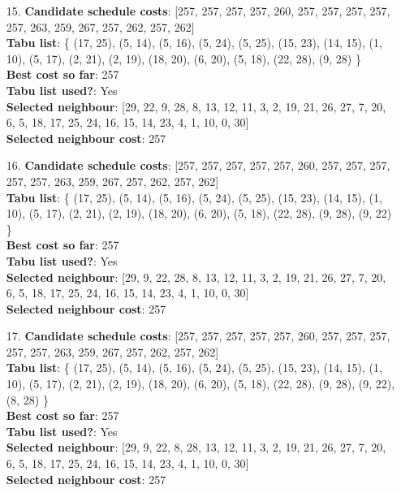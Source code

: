 \documentclass[fleqn]{article}
\begin{document}
\begin{itemize}
    \item[15.] \textbf{Candidate schedule costs}: [257, 257, 257, 257, 260, 257, 257, 257, 257, 257, 263, 259, 267, 257, 262, 257, 262] \\
    \textbf{Tabu list}: \{ (17, 25), (5, 14), (5, 16), (5, 24), (5, 25), (15, 23), (14, 15), (1, 10), (5, 17), (2, 21), (2, 19), (18, 20), (6, 20), (5, 18), (22, 28), (9, 28) \} \\
    \textbf{Best cost so far}: 257 \\
    \textbf{Tabu list used?}: Yes \\
    \textbf{Selected neighbour}: [29, 22, 9, 28, 8, 13, 12, 11, 3, 2, 19, 21, 26, 27, 7, 20, 6, 5, 18, 17, 25, 24, 16, 15, 14, 23, 4, 1, 10, 0, 30] \\
    \textbf{Selected neighbour cost}: 257
      

    \item[16.] \textbf{Candidate schedule costs}: [257, 257, 257, 257, 257, 260, 257, 257, 257, 257, 257, 263, 259, 267, 257, 262, 257, 262] \\
    \textbf{Tabu list}: \{ (17, 25), (5, 14), (5, 16), (5, 24), (5, 25), (15, 23), (14, 15), (1, 10), (5, 17), (2, 21), (2, 19), (18, 20), (6, 20), (5, 18), (22, 28), (9, 28), (9, 22) \} \\
    \textbf{Best cost so far}: 257 \\
    \textbf{Tabu list used?}: Yes \\
    \textbf{Selected neighbour}: [29, 9, 22, 28, 8, 13, 12, 11, 3, 2, 19, 21, 26, 27, 7, 20, 6, 5, 18, 17, 25, 24, 16, 15, 14, 23, 4, 1, 10, 0, 30] \\
    \textbf{Selected neighbour cost}: 257
      

    \item[17.] \textbf{Candidate schedule costs}: [257, 257, 257, 257, 257, 260, 257, 257, 257, 257, 257, 263, 259, 267, 257, 262, 257, 262] \\
    \textbf{Tabu list}: \{ (17, 25), (5, 14), (5, 16), (5, 24), (5, 25), (15, 23), (14, 15), (1, 10), (5, 17), (2, 21), (2, 19), (18, 20), (6, 20), (5, 18), (22, 28), (9, 28), (9, 22), (8, 28) \} \\
    \textbf{Best cost so far}: 257 \\
    \textbf{Tabu list used?}: Yes \\
    \textbf{Selected neighbour}: [29, 9, 22, 8, 28, 13, 12, 11, 3, 2, 19, 21, 26, 27, 7, 20, 6, 5, 18, 17, 25, 24, 16, 15, 14, 23, 4, 1, 10, 0, 30] \\
    \textbf{Selected neighbour cost}: 257
      


\end{itemize}
\end{document}
